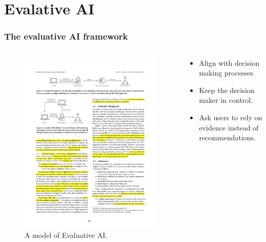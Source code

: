 \documentclass[compress,12pt]{beamer}
\begin{document}
\section{Evalative AI}
\begin{frame}
      \frametitle{The evaluative AI framework}
      \begin{columns}[T] %
            \begin{column}{.5\textwidth}
                  \begin{figure}[htbp]
                        \centering
                        \includegraphics[width=\textwidth]{fig6.pdf}
                        \caption{A model of Evaluative AI.}
                  \end{figure}
            \end{column}%
            \hfill%
            \begin{column}{.5\textwidth}
                  \begin{itemize}
                        \item Align with decision making processes.
                        \item Keep the decision maker in control.
                        \item Ask users to rely on evidence instead of recommendations.
                  \end{itemize}
            \end{column}%
      \end{columns}
\end{frame}
\end{document}
